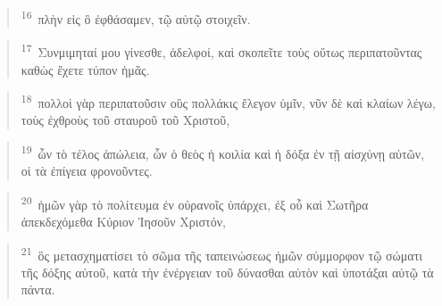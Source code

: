 \documentclass{article}
\newcommand{\currentverse}{1} %
\newcommand{\setcurrentverse}[1]{\renewcommand{\currentverse}{#1}}
\begin{document}
\begin{verse}

\setcurrentverse{16}

\setcounter{footnote}{0}

\textsuperscript{16}~πλὴν εἰς ὃ ἐφθάσαμεν, τῷ αὐτῷ στοιχεῖν.

\end{verse}

\begin{verse}

\setcurrentverse{17}

\setcounter{footnote}{0}

\textsuperscript{17}~Συνμιμηταί μου γίνεσθε, ἀδελφοί, καὶ σκοπεῖτε τοὺς οὕτως περιπατοῦντας καθὼς ἔχετε τύπον ἡμᾶς.

\end{verse}

\begin{verse}

\setcurrentverse{18}

\setcounter{footnote}{0}

\textsuperscript{18}~πολλοὶ γὰρ περιπατοῦσιν οὓς πολλάκις ἔλεγον ὑμῖν, νῦν δὲ καὶ κλαίων λέγω, τοὺς ἐχθροὺς τοῦ σταυροῦ τοῦ Χριστοῦ,

\end{verse}

\begin{verse}

\setcurrentverse{19}

\setcounter{footnote}{0}

\textsuperscript{19}~ὧν τὸ τέλος ἀπώλεια, ὧν ὁ θεὸς ἡ κοιλία καὶ ἡ δόξα ἐν τῇ αἰσχύνῃ αὐτῶν, οἱ τὰ ἐπίγεια φρονοῦντες.

\end{verse}

\begin{verse}

\setcurrentverse{20}

\setcounter{footnote}{0}

\textsuperscript{20}~ἡμῶν γὰρ τὸ πολίτευμα ἐν οὐρανοῖς ὑπάρχει, ἐξ οὗ καὶ Σωτῆρα ἀπεκδεχόμεθα Κύριον Ἰησοῦν Χριστόν,

\end{verse}

\begin{verse}

\setcurrentverse{21}

\setcounter{footnote}{0}

\textsuperscript{21}~ὃς μετασχηματίσει τὸ σῶμα τῆς ταπεινώσεως ἡμῶν σύμμορφον τῷ σώματι τῆς δόξης αὐτοῦ, κατὰ τὴν ἐνέργειαν τοῦ δύνασθαι αὐτὸν καὶ ὑποτάξαι αὐτῷ τὰ πάντα.

\end{verse}
\end{document}
